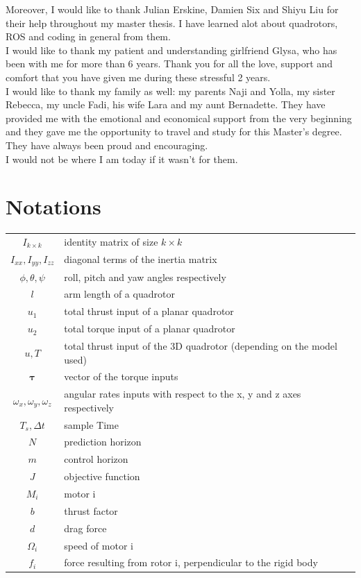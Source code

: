 \documentclass{thesisreport}
\begin{document}
Moreover, I would like to thank Julian Erskine, Damien Six and Shiyu Liu for their help throughout my master thesis. I have learned alot about quadrotors, ROS and coding in general from them. \\

I would like to thank my patient and understanding girlfriend Glysa, who has been with me for more than 6 years. Thank you for all the love, support and comfort that you have given me during these stressful 2 years. \\

I would like to thank my family as well: my parents Naji and Yolla, my sister Rebecca, my uncle Fadi, his wife Lara and my aunt Bernadette. They have provided me with the emotional and economical support from the very beginning and they gave me the opportunity to travel and study for this Master's degree. They have always been proud and encouraging. \\I would not be where I am today if it wasn't for them.
 
 \newpage
 
 
 \section*{Notations}
  \begin{tabular}{cp{}}
  $I_{k \times k}$ & identity matrix of size $k \times k$ \\
  $I_{xx}, I_{yy}, I_{zz}$ & diagonal terms of the inertia matrix\\
  $\phi, \theta, \psi$ & roll, pitch and yaw angles respectively\\
  $l$ & arm length of a quadrotor \\
  $u_1$ & total thrust input of a planar quadrotor \\
  $u_2$ & total torque input of a planar quadrotor \\
  $u, T$ & total thrust input of the 3D quadrotor (depending on the model used)\\  
  $\bm{\tau}$ & vector of the torque inputs \\
  $\omega_x, \omega_y, \omega_z$ & angular rates inputs with respect to the x, y and z axes respectively \\
  $T_s, \Delta t$ & sample Time \\
  $N$ & prediction horizon \\
  $m$ & control horizon \\
  $J$ & objective function \\
  $M_i$ & motor i \\
  $b$ & thrust factor \\
  $d$ & drag force \\
  $\Omega_i$ & speed of motor i \\
  $f_i$ & force resulting from rotor i, perpendicular to the rigid body \\
  
  

\end{tabular}\\
 \newpage
 
\end{document}
